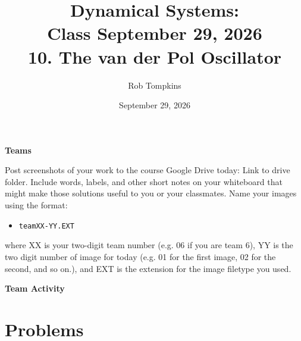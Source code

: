 \documentclass[12pt]{amsart}
\title{Dynamical Systems:\\Class September 29, 2026\\ 10. The van der Pol Oscillator}
\author{Rob Tompkins}
\date{September 29, 2026}
\theoremstyle{plain}
\theoremstyle{definition}
\theoremstyle{definition}
\theoremstyle{plain}
\begin{document}
    \maketitle
    {\large\bfseries Teams}

    Post screenshots of your work to the course Google Drive today: Link to drive folder. Include words, labels, and other short notes on your whiteboard that might make those solutions useful to you or your classmates. Name your images using the format:
    \begin{itemize}
        \item \texttt{teamXX-YY.EXT}
    \end{itemize}
    where XX is your two-digit team number (e.g. 06 if you are team 6), YY is the two digit number of image for today (e.g. 01 for the first image, 02 for the second, and so on.), and EXT is the extension for the image filetype you used.

    \par\medskip
    {\large\bfseries Team Activity}

    \section*{Problems}
\end{document}
